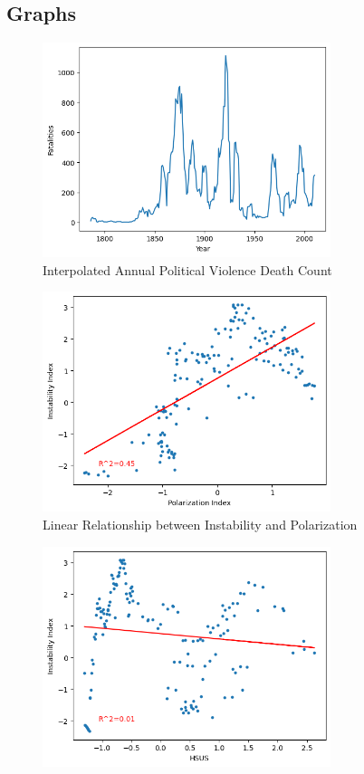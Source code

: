 \documentclass[twocolumn]{article}
\begin{document}
\begin{appendices}
\section{Graphs}
\FloatBarrier
\begin{figure}[h!]
    \centering
    \includegraphics[width=0.75\textwidth]{images/fatalities.png}
    \caption{Interpolated Annual Political Violence Death Count}
    \label{fatalities}
\end{figure}
\FloatBarrier
\begin{figure}[h!]
    \centering
    \includegraphics[width=0.75\textwidth]{images/linear.png}
    \caption{Linear Relationship between Instability and Polarization}
    \label{linear}
\end{figure}
\FloatBarrier
\begin{figure}[h!]
    \centering
    \includegraphics[width=0.75\textwidth]{images/nonlinear.png}

\end{figure}
\end{appendices}
\end{document}
